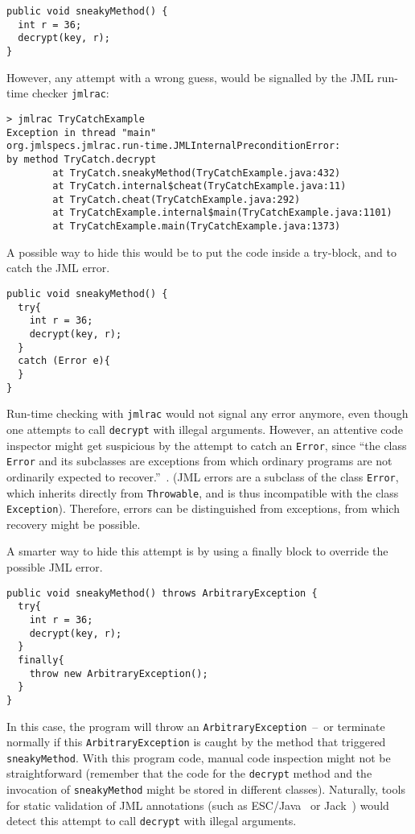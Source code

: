 \documentclass[]{llncs}
\begin{document}
\begin{verbatim}
public void sneakyMethod() {
  int r = 36; 
  decrypt(key, r);                                           
}
\end{verbatim}

However, any attempt with a wrong guess, would be signalled by the JML
run-time checker \texttt{jmlrac}:
\begin{verbatim}
> jmlrac TryCatchExample
Exception in thread "main" 
org.jmlspecs.jmlrac.run-time.JMLInternalPreconditionError: 
by method TryCatch.decrypt
        at TryCatch.sneakyMethod(TryCatchExample.java:432)
        at TryCatch.internal$cheat(TryCatchExample.java:11)
        at TryCatch.cheat(TryCatchExample.java:292)
        at TryCatchExample.internal$main(TryCatchExample.java:1101)
        at TryCatchExample.main(TryCatchExample.java:1373)
\end{verbatim}

A possible way to hide this would be to put the code inside a
try-block, and to catch the JML error.

\begin{verbatim}
public void sneakyMethod() {
  try{ 
    int r = 36; 
    decrypt(key, r);                                           
  }           
  catch (Error e){
  }
}
\end{verbatim}
Run-time checking with \texttt{jmlrac} would not signal any error
anymore, even though one attempts to call \texttt{decrypt} with
illegal arguments. However, an attentive code inspector might get
suspicious by the attempt to catch an \texttt{Error}, since ``the
class \texttt{Error} and its subclasses are exceptions from which
ordinary programs are not ordinarily expected to recover.''~\cite[\S
11.5]{GoslingJSB05}. (JML errors are a subclass of the class
\texttt{Error}, which inherits directly from \texttt{Throwable}, and
is thus incompatible with the class \texttt{Exception}). Therefore,
errors can be distinguished from exceptions, from which recovery might
be possible.

A smarter way to hide this attempt is by using a finally block to
override the possible JML error.
\begin{verbatim}
public void sneakyMethod() throws ArbitraryException {
  try{ 
    int r = 36; 
    decrypt(key, r);                                           
  }           
  finally{
    throw new ArbitraryException();
  }
}
\end{verbatim}
In this case, the program will throw an
\texttt{ArbitraryException}~--~or terminate normally if this
\texttt{ArbitraryException} is caught by the method that triggered
\texttt{sneakyMethod}. With this program code, manual code inspection
might not be straightforward (remember that the code for the
\texttt{decrypt} method and the invocation of \texttt{sneakyMethod}
might be stored in different classes). Naturally, tools for static
validation of JML annotations (such as ESC/Java~\cite{CokK04} or
Jack~\cite{BartheBCGHLPR07:FMCO}) would detect this attempt to call
\texttt{decrypt} with illegal arguments.
\end{document}
